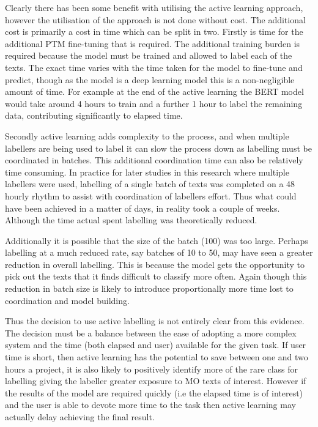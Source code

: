Clearly there has been some benefit with utilising the active learning approach, however the utilisation of the approach is not done without cost. The additional cost is primarily a cost in time which can be split in two. Firstly is time for the additional PTM fine-tuning that is required. The additional training burden is required because the model must be trained and allowed to label each of the texts. The exact time varies with the time taken for the model to fine-tune and predict, though as the model is a deep learning model this is a  non-negligible amount of time. For example at the end of the active learning the BERT model would take around 4 hours to train and a further 1 hour to label the remaining data, contributing significantly to elapsed time. 

Secondly active learning adds complexity to the process, and when multiple labellers are being used to label it can slow the process down as labelling must be coordinated in batches. This additional coordination time can also be relatively time consuming. In practice for later studies in this research where multiple labellers were used, labelling of a single batch of  texts was completed on a 48 hourly rhythm to assist with coordination of labellers effort. Thus what could have been achieved in a matter of days, in reality took a couple of weeks. Although the time actual spent labelling was theoretically reduced. 

Additionally it is possible that the size of the batch (100) was too large. Perhaps labelling at a much reduced rate, say batches of 10 to 50, may have seen a greater reduction in overall labelling. This is because the model gets the opportunity to pick out the texts that it finds difficult to classify more often. Again though this reduction in batch size is likely to introduce proportionally more time lost to coordination and model building.

Thus the decision to use active labelling is not entirely clear from this evidence. The decision must be a balance between the ease of adopting a more complex system and the time (both elapsed and user) available for the given task. If user time is short, then active learning has the potential to save between one and two hours a project, it is also likely to positively identify more of the rare class for labelling giving the labeller greater exposure to MO texts of interest. However if the results of the model are required quickly (i.e the elapsed time is of interest) and the user is able to devote more time to the task then active learning may actually delay achieving the final result.


